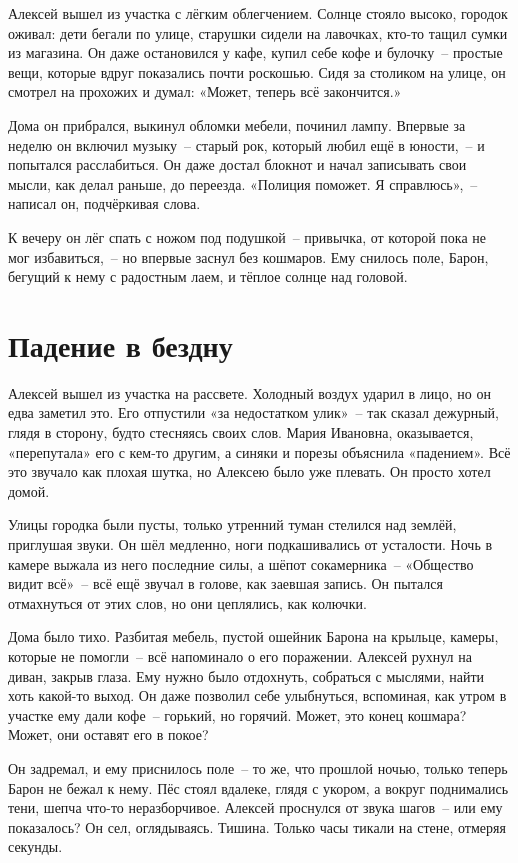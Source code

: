 \documentclass[12pt,a4paper]{book}
\begin{document}
Алексей вышел из участка с лёгким облегчением. Солнце стояло высоко, городок оживал: дети бегали по улице, старушки сидели на лавочках, кто-то тащил сумки из магазина. Он даже остановился у кафе, купил себе кофе и булочку~-- простые вещи, которые вдруг показались почти роскошью. Сидя за столиком на улице, он смотрел на прохожих и думал: «Может, теперь всё закончится.»

Дома он прибрался, выкинул обломки мебели, починил лампу. Впервые за неделю он включил музыку~-- старый рок, который любил ещё в юности,~-- и попытался расслабиться. Он даже достал блокнот и начал записывать свои мысли, как делал раньше, до переезда. «Полиция поможет. Я справлюсь»,~-- написал он, подчёркивая слова.

К вечеру он лёг спать с ножом под подушкой~-- привычка, от которой пока не мог избавиться,~-- но впервые заснул без кошмаров. Ему снилось поле, Барон, бегущий к нему с радостным лаем, и тёплое солнце над головой.

\chapter{Падение в бездну}

Алексей вышел из участка на рассвете. Холодный воздух ударил в лицо, но он едва заметил это. Его отпустили «за недостатком улик»~-- так сказал дежурный, глядя в сторону, будто стесняясь своих слов. Мария Ивановна, оказывается, «перепутала» его с кем-то другим, а синяки и порезы объяснила «падением». Всё это звучало как плохая шутка, но Алексею было уже плевать. Он просто хотел домой.

Улицы городка были пусты, только утренний туман стелился над землёй, приглушая звуки. Он шёл медленно, ноги подкашивались от усталости. Ночь в камере выжала из него последние силы, а шёпот сокамерника~-- «Общество видит всё»~-- всё ещё звучал в голове, как заевшая запись. Он пытался отмахнуться от этих слов, но они цеплялись, как колючки.

Дома было тихо. Разбитая мебель, пустой ошейник Барона на крыльце, камеры, которые не помогли~-- всё напоминало о его поражении. Алексей рухнул на диван, закрыв глаза. Ему нужно было отдохнуть, собраться с мыслями, найти хоть какой-то выход. Он даже позволил себе улыбнуться, вспоминая, как утром в участке ему дали кофе~-- горький, но горячий. Может, это конец кошмара? Может, они оставят его в покое?

Он задремал, и ему приснилось поле~-- то же, что прошлой ночью, только теперь Барон не бежал к нему. Пёс стоял вдалеке, глядя с укором, а вокруг поднимались тени, шепча что-то неразборчивое. Алексей проснулся от звука шагов~-- или ему показалось? Он сел, оглядываясь. Тишина. Только часы тикали на стене, отмеряя секунды.
\end{document}
